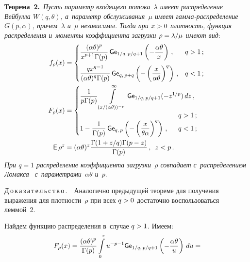 \begin{multicols}{2}
\noindent
\textbf{Теорема~2.}\
\textit{Пусть параметр входящего потока~$\lambda$ имеет распределение 
Вейбулла $W(q,\theta)$, а~параметр обслуживания~$\mu$ имеет 
гам\-ма-рас\-пре\-де\-ле\-ние $G(p, \alpha)$, причем~$\lambda$ и~$\mu$ независимы. Тогда при $x\hm>0$ 
плотность, функция распределения и~моменты коэффициента загрузки $\rho\hm=\lambda/\mu$ 
имеют вид}:
\begin{align*}
f_\rho(x) &=
 \begin{cases}
   \fr{(\alpha \theta)^p}{{ x^{p+1}\Gamma(p)}}\,
   {\sf Ge}_{1/q,\, p/q+1} \left(-\fr{\alpha \theta}{x}\right)\,, &q > 1\,;\\[12pt]
  \fr{qx^{q-1}}{{(\alpha \theta)^{q}\Gamma(p)}}\,
  {\sf Ge}_{q,\, p+q} \left(-\left(\fr{x}{\alpha \theta}\right)^{q}\right)\,, &q < 1\,;
 \end{cases}
\\
F_\rho(x) &=
 \begin{cases}
   \fr{1}{{p\Gamma(p)}}\int\limits_{(x/(\alpha \theta))^{-p}}^{\infty} 
   {\sf Ge}_{1/q,\, p/q+1} (-z^{1/p}) \, dz\,, &\\
   &\hspace*{-12mm}q > 1\,;\\
   1-\fr{1}{{\Gamma(p)}}\,{\sf Ge}_{q,\, p}
   \left(-\left(\fr{x}{\theta \alpha}\right)^{q}\right)\,, &\hspace*{-12mm}q < 1\,;
 \end{cases}
\\
{\sf E}\,\rho^z &= (\alpha \theta)^z \fr{\Gamma(1+z/q) 
\Gamma(p-z)}{\Gamma(p)}\,, \enskip z<p\,.
\end{align*}
\textit{При $q=1$ распределение коэффициента загрузки~$\rho$ совпадает с~распределением 
Ломакса}~\cite{Lomax1954} \textit{с~па\-ра\-мет\-ра\-ми~$\alpha\theta$ и~$p$}.


\smallskip

\noindent
Д\,о\,к\,а\,з\,а\,т\,е\,л\,ь\,с\,т\,в\,о\,.\ \
 Аналогично предыдущей тео\-ре\-ме для получения выражения для плот\-ности~$\rho$ при всех 
 $q\hm >0$ достаточно воспользоваться леммой~2.

Найдем функцию распределения в~случае $q\hm>1$. Имеем:
\begin{multline*}
\!F_\rho(x) = \displaystyle\frac{\displaystyle (\alpha \theta)^p\mathstrut}{\displaystyle \Gamma(p)\mathstrut}\int\limits_{0}^{x}u^{-p-1}
{\sf Ge}_{1/q,\, p/q+1} \left(-\displaystyle\frac{\displaystyle \alpha \theta\mathstrut}{\displaystyle u\mathstrut}\right) \, du ={}\hspace*{-6.61475pt}
\end{multline*}


\end{multicols}
